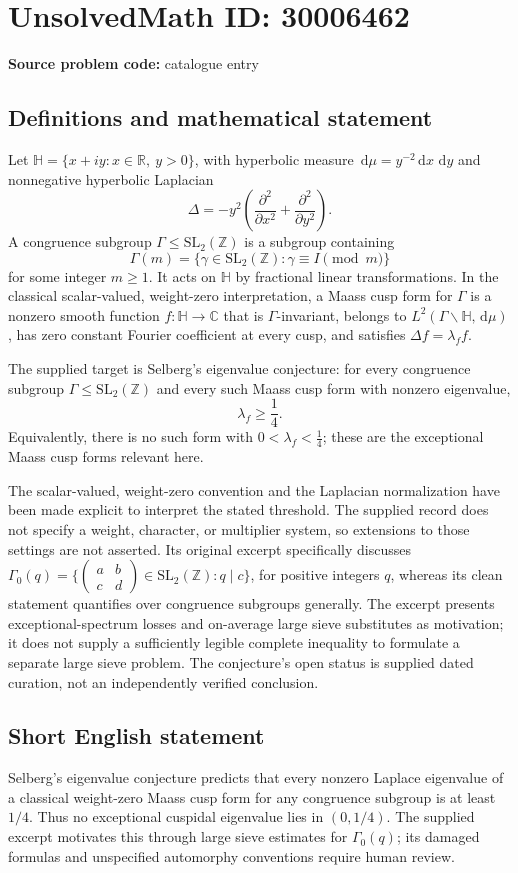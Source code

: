 \documentclass[11pt]{article}
\newcommand{\Z}{\mathbb{Z}}
\newcommand{\R}{\mathbb{R}}
\newcommand{\C}{\mathbb{C}}
\newcommand{\dd}{\,\mathrm{d}}
\begin{document}
\section*{UnsolvedMath ID: 30006462}
\textbf{Source problem code:} catalogue entry
\subsection{Definitions and mathematical statement}
Let \(\mathbb H=\{x+iy:x\in\R,\ y>0\}\), with hyperbolic measure \(\dd\mu=y^{-2}\dd x\,\dd y\) and nonnegative hyperbolic Laplacian
\[
\Delta=-y^2\left(\frac{\partial^2}{\partial x^2}+\frac{\partial^2}{\partial y^2}\right).
\]
A congruence subgroup \(\Gamma\leq\mathrm{SL}_2(\Z)\) is a subgroup containing
\[
\Gamma(m)=\{\gamma\in\mathrm{SL}_2(\Z):\gamma\equiv I\pmod m\}
\]
for some integer \(m\geq1\). It acts on \(\mathbb H\) by fractional linear transformations. In the classical scalar-valued, weight-zero interpretation, a Maass cusp form for \(\Gamma\) is a nonzero smooth function \(f:\mathbb H\to\C\) that is \(\Gamma\)-invariant, belongs to \(L^2(\Gamma\backslash\mathbb H,\dd\mu)\), has zero constant Fourier coefficient at every cusp, and satisfies \(\Delta f=\lambda_f f\).

The supplied target is Selberg's eigenvalue conjecture: for every congruence subgroup \(\Gamma\leq\mathrm{SL}_2(\Z)\) and every such Maass cusp form with nonzero eigenvalue,
\[
\lambda_f\geq\frac14.
\]
Equivalently, there is no such form with \(0<\lambda_f<\tfrac14\); these are the exceptional Maass cusp forms relevant here.

The scalar-valued, weight-zero convention and the Laplacian normalization have been made explicit to interpret the stated threshold. The supplied record does not specify a weight, character, or multiplier system, so extensions to those settings are not asserted. Its original excerpt specifically discusses \(\Gamma_0(q)=\{\left(\begin{smallmatrix}a&b\\c&d\end{smallmatrix}\right)\in\mathrm{SL}_2(\Z):q\mid c\}\), for positive integers \(q\), whereas its clean statement quantifies over congruence subgroups generally. The excerpt presents exceptional-spectrum losses and on-average large sieve substitutes as motivation; it does not supply a sufficiently legible complete inequality to formulate a separate large sieve problem. The conjecture's open status is supplied dated curation, not an independently verified conclusion.
\subsection{Short English statement}
Selberg's eigenvalue conjecture predicts that every nonzero Laplace eigenvalue of a classical weight-zero Maass cusp form for any congruence subgroup is at least \(1/4\). Thus no exceptional cuspidal eigenvalue lies in \((0,1/4)\). The supplied excerpt motivates this through large sieve estimates for \(\Gamma_0(q)\); its damaged formulas and unspecified automorphy conventions require human review.
\end{document}
